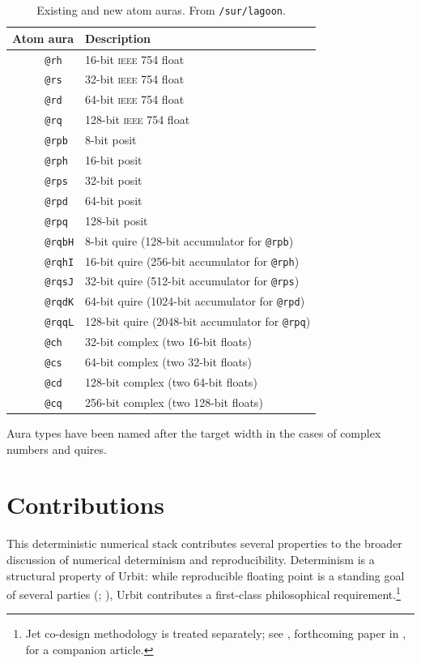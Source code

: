 \documentclass[twoside]{article}
\begin{document}
\begin{table}[h]
\centering
\caption{Existing and new atom auras.  From \texttt{/sur/lagoon}.}
\label{tab:auras}
\begin{tabular}{@{}rl@{}}
\toprule
Atom aura & Description \\
\midrule
\texttt{@rh~~} & 16-bit \textsc{ieee} 754 float \\
\texttt{@rs~~} & 32-bit \textsc{ieee} 754 float \\
\texttt{@rd~~} & 64-bit \textsc{ieee} 754 float \\
\texttt{@rq~~} & 128-bit \textsc{ieee} 754 float \\
\midrule
\texttt{@rpb~} & 8-bit posit \\
\texttt{@rph~} & 16-bit posit \\
\texttt{@rps~} & 32-bit posit \\
\texttt{@rpd~} & 64-bit posit \\
\texttt{@rpq~} & 128-bit posit \\
\texttt{@rqbH} & 8-bit quire (128-bit accumulator for \texttt{@rpb}) \\
\texttt{@rqhI} & 16-bit quire (256-bit accumulator for \texttt{@rph}) \\
\texttt{@rqsJ} & 32-bit quire (512-bit accumulator for \texttt{@rps}) \\
\texttt{@rqdK} & 64-bit quire (1024-bit accumulator for \texttt{@rpd}) \\
\texttt{@rqqL} & 128-bit quire (2048-bit accumulator for \texttt{@rpq}) \\
\midrule
\texttt{@ch~~} & 32-bit complex (two 16-bit floats) \\
\texttt{@cs~~} & 64-bit complex (two 32-bit floats) \\
\texttt{@cd~~} & 128-bit complex (two 64-bit floats) \\
\texttt{@cq~~} & 256-bit complex (two 128-bit floats) \\
\bottomrule
\end{tabular}
\end{table}

Aura types have been named after the target width in the cases of complex numbers and quires.

\section{Contributions}

This deterministic numerical stack contributes several properties to the broader discussion of numerical determinism and reproducibility.  Determinism is a structural property of Urbit:  while reproducible floating point is a standing goal of several parties (\citet{demmel2013reproducible}; \citet{intel_cnr}), Urbit contributes a first-class philosophical requirement.\footnote{Jet co-design methodology is treated separately; see , forthcoming paper in , for a companion article.}
\end{document}
